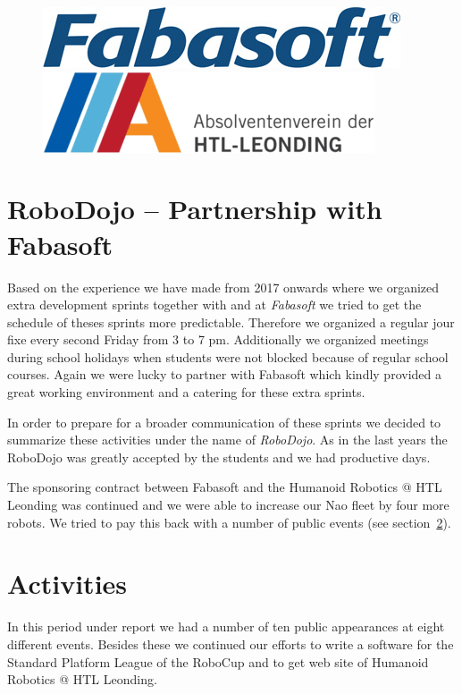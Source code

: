 \documentclass[11pt]{article}
\begin{document}
\begin{figure}[b]
\begin{center}
\includegraphics[scale=0.38]{img/fabasoft.png}
\hfill
\includegraphics[scale=0.38]{img/absleoLogo.png}
\end{center}
\end{figure}

\section{RoboDojo – Partnership with Fabasoft}
Based on the experience we have made from 2017 onwards where we organized extra development sprints together with and at {\em Fabasoft} we tried to get the schedule of theses sprints more predictable. Therefore we organized a regular jour fixe every second Friday from 3 to 7 pm. Additionally we organized meetings during school holidays when students were not blocked because of regular school courses. Again we were lucky to partner with Fabasoft which kindly provided a great working environment and a catering for these extra sprints.

In order to prepare for a broader communication of these sprints we decided to summarize these activities under the name of {\em RoboDojo}. As in the last years the RoboDojo was greatly accepted by the students and we had productive days.

The sponsoring contract between Fabasoft and the Humanoid Robotics @ HTL Leonding was continued and we were able to increase our Nao fleet by four more robots. We tried to pay this back with a number of public events (see section~\ref{sec:activities_overview}).

\section{Activities}\label{sec:activities_overview}
In this period under report we had a number of ten public appearances at eight different events. Besides these we continued our efforts to write a software for the Standard Platform League of the RoboCup and to get web site of Humanoid Robotics @ HTL Leonding.
\end{document}
